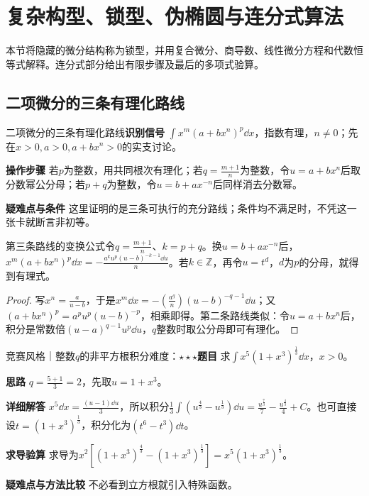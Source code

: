 \section{复杂构型、锁型、伪椭圆与连分式算法}\label{ic:indefinite_algebra_complete}

\begin{examtip}本节将隐藏的微分结构称为锁型，并用复合微分、商导数、线性微分方程和代数恒等式解释。连分式部分给出有限步骤及最后的多项式验算。\end{examtip}

\subsection{二项微分的三条有理化路线}\label{ic:indefinite_algebra_complete:binomial}\begin{method}{二项微分的三条有理化路线}\textbf{识别信号} $\int x^m(a+bx^n)^p\dd x$，指数有理，$n\ne0$；先在$x>0,a>0,a+bx^n>0$的实支讨论。\par \textbf{操作步骤} 若$p$为整数，用共同根次有理化；若$q=\frac{m+1}{n}$为整数，令$u=a+bx^n$后取分数幂公分母；若$p+q$为整数，令$u=b+ax^{-n}$后同样消去分数幂。\par \textbf{疑难点与条件} 这里证明的是三条可执行的充分路线；条件均不满足时，不凭这一张卡就断言非初等。\end{method}

\begin{theorem}{第三条路线的变换公式}令$q=\frac{m+1}{n}$、$k=p+q$。换$u=b+ax^{-n}$后，$x^m(a+bx^n)^p\dd x=-\frac{a^k u^p(u-b)^{-k-1}\dd u}{n}$。若$k\in\mathbb Z$，再令$u=t^d$，$d$为$p$的分母，就得到有理式。\end{theorem}\begin{proof}写$x^n=\frac{a}{u-b}$，于是$x^m\dd x=-(\frac{a^q}{n})(u-b)^{-q-1}\dd u$；又$(a+bx^n)^p=a^pu^p(u-b)^{-p}$，相乘即得。第二条路线类似：令$u=a+bx^n$后，积分是常数倍$(u-a)^{q-1}u^p\dd u$，$q$整数时取公分母即可有理化。\end{proof}

\begin{example}{竞赛风格｜整数$q$的非平方根积分}{难度：$\star\star\star$}\label{ic:ex:indefinite_algebra_complete:binomialq}\textbf{题目} 求$\int x^5(1+x^3)^{\frac{1}{3}}\dd x$，$x>0$。\par \textbf{思路} $q=\frac{5+1}{3}=2$，先取$u=1+x^3$。\par \textbf{详细解答} $x^5\dd x=\frac{(u-1)\dd u}{3}$，所以积分$\frac13\int(u^{\frac{4}{3}}-u^{\frac{1}{3}})\dd u=\frac{u^{\frac{7}{3}}}{7}-\frac{u^{\frac{4}{3}}}{4}+C$。也可直接设$t=(1+x^3)^{\frac{1}{3}}$，积分化为$(t^6-t^3)\dd t$。\par \textbf{求导验算} 求导为$x^2[(1+x^3)^{\frac{4}{3}}-(1+x^3)^{\frac{1}{3}}]=x^5(1+x^3)^{\frac{1}{3}}$。\par \textbf{疑难点与方法比较} 不必看到立方根就引入特殊函数。\end{example}

